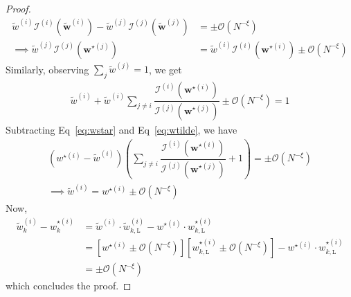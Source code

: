 \documentclass{article}
\begin{document}
\begin{proof}
       \begin{align*}
           \tilde{w}^{(i)}  \mathcal{I}^{(i)}(\tilde{\bm{w}}^{(i)})- \tilde{w}^{(j)}  \mathcal{I}^{(j)}(\tilde{\bm{w}}^{(j)})&=\pm \mathcal{O}(N^{-\xi})\\
           \implies  \tilde{w}^{(j)}\mathcal{I}^{(j)}({\bm{w}}^{\star(j)}) &= \tilde{w}^{(i)}\mathcal{I}^{(i)}({\bm{w}}^{\star(i)}) \pm\mathcal{O}(N^{-\xi})
       \end{align*}
Similarly, observing $\sum_j\tilde{w}^{(j)}=1$, we get
\begin{align}
   \tilde{w}^{(i)} +  \tilde{w}^{(i)} \sum_{j\neq i}\dfrac{\mathcal{I}^{(i)}({\bm{w}}^{\star(i)}) }{\mathcal{I}^{(j)}({\bm{w}}^{\star(j)}) } \pm\mathcal{O}(N^{-\xi}) = 1 \label{eq:wtilde}
\end{align}
Subtracting Eq~\ref{eq:wstar} and Eq~\ref{eq:wtilde}, we have
\begin{align*}
    (w^{\star (i)} - \tilde{w}^{(i)}) \left( \sum_{j\neq i}\dfrac{\mathcal{I}^{(i)}({\bm{w}}^{\star(i)}) }{\mathcal{I}^{(j)}({\bm{w}}^{\star(j)}) }+1\right)  = \pm\mathcal{O}(N^{-\xi})\\
    \implies  \tilde{w}^{(i)} = w^{\star (i)} \pm\mathcal{O}(N^{-\xi})
\end{align*}
Now, 
\begin{align*}
    \tilde{w}^{(i)}_{k} - w^{\star (i)}_{k}&= \tilde{w}^{ (i)}\cdot\tilde{w}^{(i)}_{k,\texttt{L}}-w^{\star (i)}\cdot w^{\star (i)}_{k,\texttt{L}}\\
    &= [w^{\star (i)} \pm\mathcal{O}(N^{-\xi})][w^{\star (i)}_{k,\texttt{L}}\pm\mathcal{O}(N^{-\xi})]-w^{\star (i)}\cdot w^{\star (i)}_{k,\texttt{L}}\\
    &= \pm\mathcal{O}(N^{-\xi})
\end{align*}
which concludes the proof.
\end{proof}
\end{document}
